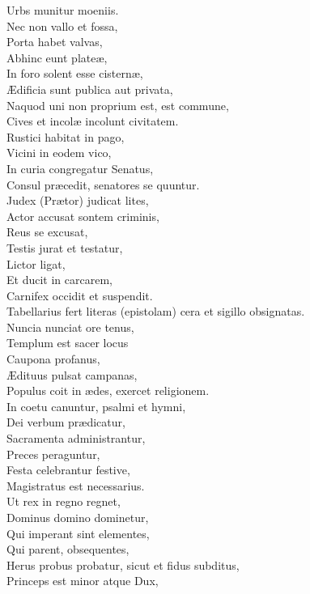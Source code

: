 \documentclass[12pt, twocolumn]{memoir}
\begin{document}
Urbs munitur moeniis.\\
Nec non vallo et fossa,\\
Porta habet valvas,\\
Abhinc eunt plateæ,\\
In foro solent esse cisternæ,\\
Ædificia sunt publica aut privata,\\
Naquod uni non proprium est, est commune,\\
Cives et incolæ incolunt civitatem.\\
Rustici habitat in pago,\\
Vicini in eodem vico,\\
In curia congregatur Senatus,\\
Consul præcedit, senatores se quuntur.\\
Judex (Prætor) judicat lites,\\
Actor accusat sontem criminis,\\
Reus se excusat,\\
Testis jurat et testatur,\\
Lictor ligat,\\
Et ducit in carcarem,\\
Carnifex occidit et suspendit.\\
Tabellarius fert literas (epistolam) cera et sigillo obsignatas.\\
Nuncia nunciat ore tenus,\\
Templum est sacer locus\\
Caupona profanus,\\
Ædituus pulsat campanas,\\
Populus coit in ædes, exercet religionem.\\
In coetu canuntur, psalmi et hymni,\\
Dei verbum prædicatur,\\
Sacramenta administrantur,\\
Preces peraguntur,\\
Festa celebrantur festive,\\
Magistratus est necessarius.\\
Ut rex in regno regnet,\\
Dominus domino dominetur,\\
Qui imperant sint elementes,\\
Qui parent, obsequentes,\\
Herus probus probatur, sicut et fidus subditus,\\
Princeps est minor atque Dux,\\
\end{document}
